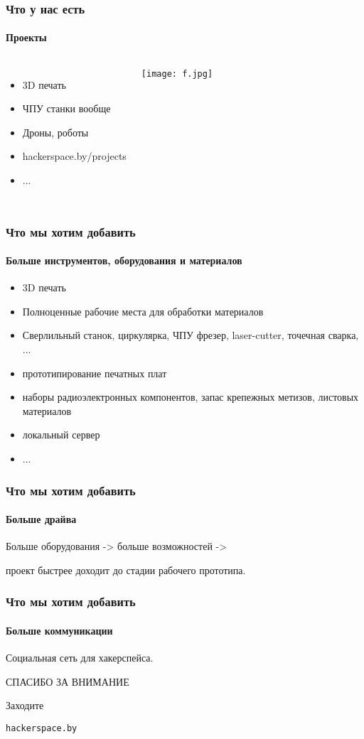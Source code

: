 \documentclass{beamer}
\newif\ifplacelogo %
\begin{document}
\begin {frame}
\frametitle {Что у нас есть}
\framesubtitle {Проекты}
\begin{columns}
\begin{itemize}
\item 3D печать
\item ЧПУ станки вообще
\item Дроны, роботы
\item hackerspace.by/projects
\item ...
\end{itemize}
  \texttt{[image: f.jpg]}
\end{columns}
\end {frame}


\begin {frame}
\frametitle {Что мы хотим добавить}
\framesubtitle {Больше инструментов, оборудования и материалов}
\begin{itemize}
\item 3D печать
\item Полноценные рабочие места для обработки материалов
\item Сверлильный станок, циркулярка, ЧПУ фрезер, laser-cutter, точечная сварка, ...
\item прототипирование печатных плат
\item наборы радиоэлектронных компонентов, запас крепежных метизов, листовых материалов
\item локальный сервер
\item ...
\end{itemize}
\end {frame}


\begin {frame}
\frametitle {Что мы хотим добавить}
\framesubtitle {Больше драйва}
Больше оборудования -> больше возможностей -> 

проект быстрее доходит до стадии рабочего прототипа.
\end {frame}


\begin {frame}
\frametitle {Что мы хотим добавить}
\framesubtitle {Больше коммуникации}
Социальная сеть для хакерспейса.
\end {frame}


\placelogofalse

\begin {frame}
\begin{center}
СПАСИБО ЗА ВНИМАНИЕ

Заходите

\texttt{hackerspace.by}
\end{center}
\end {frame}
\end{document}

